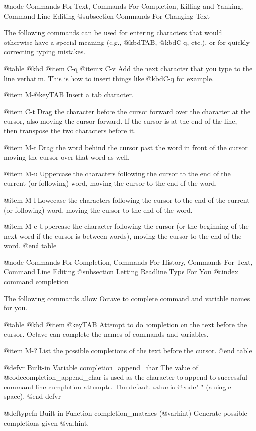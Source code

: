 @node Commands For Text, Commands For Completion, Killing and Yanking, Command Line Editing
@subsection Commands For Changing Text

The following commands can be used for entering characters that would
otherwise have a special meaning (e.g., @kbd{TAB}, @kbd{C-q}, etc.), or
for quickly correcting typing mistakes.

@table @kbd
@item C-q
@itemx C-v
Add the next character that you type to the line verbatim.  This is
how to insert things like @kbd{C-q} for example.

@item M-@key{TAB}
Insert a tab character.

@item C-t
Drag the character before the cursor forward over the character at the
cursor, also moving the cursor forward.  If the cursor is at the end of
the line, then transpose the two characters before it.

@item M-t
Drag the word behind the cursor past the word in front of the cursor
moving the cursor over that word as well.

@item M-u
Uppercase the characters following the cursor to the end of the current
(or following) word, moving the cursor to the end of the word.

@item M-l
Lowecase the characters following the cursor to the end of the current
(or following) word, moving the cursor to the end of the word.

@item M-c
Uppercase the character following the cursor (or the beginning of the
next word if the cursor is between words), moving the cursor to the end
of the word.
@end table

@node Commands For Completion, Commands For History, Commands For Text, Command Line Editing
@subsection Letting Readline Type For You
@cindex command completion

The following commands allow Octave to complete command and variable
names for you.

@table @kbd
@item @key{TAB}
Attempt to do completion on the text before the cursor.  Octave can
complete the names of commands and variables.

@item M-?
List the possible completions of the text before the cursor.
@end table

@defvr {Built-in Variable} completion_append_char
The value of @code{completion_append_char} is used as the character to
append to successful command-line completion attempts.  The default
value is @code{" "} (a single space).
@end defvr

@deftypefn {Built-in Function} {} completion_matches (@var{hint})
Generate possible completions given @var{hint}.

